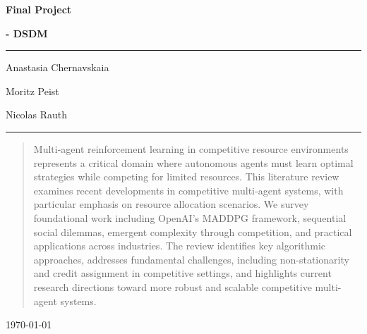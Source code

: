 \documentclass[12pt]{article}
\begin{document}
\begin{titlepage}
	\centering
	\par\vspace{0.75cm}
	{\huge\bfseries Final Project\par}
    {\large\bfseries \cl - DSDM\par}
	\vspace{0.25cm}
    \noindent\rule{\textwidth}{1pt}
    {\Large Anastasia Chernavskaia\par}
	{\Large Moritz Peist\par}
    {\Large Nicolas Rauth\par}
    \noindent\rule{\textwidth}{1pt}
	\vfill
    \begin{abstract}
        Multi-agent reinforcement learning in competitive resource environments represents a critical domain where autonomous agents must learn optimal strategies while competing for limited resources. This literature review examines recent developments in competitive multi-agent systems, with particular emphasis on resource allocation scenarios. We survey foundational work including OpenAI's MADDPG framework, sequential social dilemmas, emergent complexity through competition, and practical applications across industries. The review identifies key algorithmic approaches, addresses fundamental challenges, including non-stationarity and credit assignment in competitive settings, and highlights current research directions toward more robust and scalable competitive multi-agent systems.
    \end{abstract}
    \vfill
	{\large \today\par}
\end{titlepage}

\tableofcontents
\newpage


\printbibliography

\newpage

\end{document}
